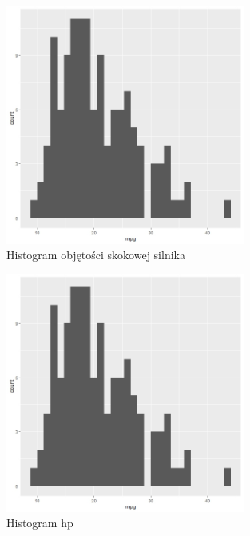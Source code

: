 \documentclass{article}
\begin{document}
            \begin{figure}[H]
                \caption{Histogram objętości skokowej silnika}
                \centering
                \includegraphics[width=0.7\textwidth]{../histograms/mpg_hist.jpeg}
            \end{figure}
            \begin{figure}[H]
                \caption{Histogram hp}
                \centering
                \includegraphics[width=0.7\textwidth]{../histograms/mpg_hist.jpeg}
            \end{figure}
\end{document}
